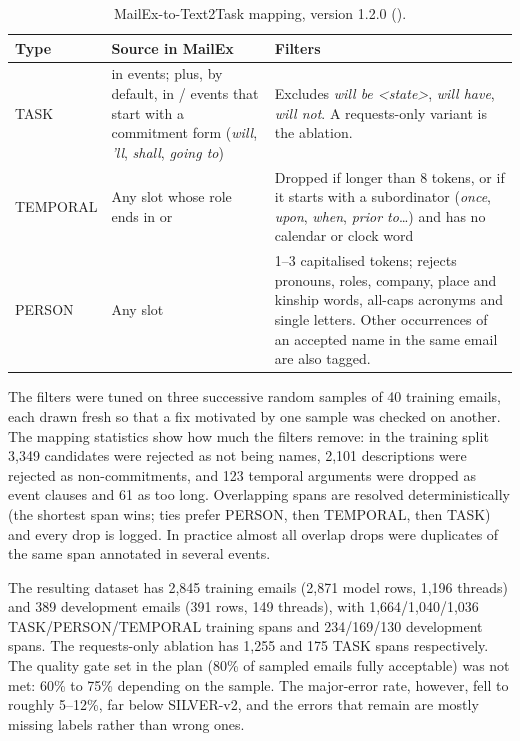 \begin{table}[h]
\centering
\caption{MailEx-to-Text2Task mapping, version 1.2.0 ().}
\label{tab:mapping}
\footnotesize
\begin{tabularx}{\linewidth}{@{}p{17mm}LL@{}}
\toprule
Type & Source in MailEx & Filters \\
\midrule
TASK &  in  events; plus, by default,  in / events that start with a commitment form (\emph{will}, \emph{'ll}, \emph{shall}, \emph{going to}) & Excludes \emph{will be \textless state\textgreater}, \emph{will have}, \emph{will not}. A requests-only variant is the ablation. \\
TEMPORAL & Any slot whose role ends in  or  & Dropped if longer than 8 tokens, or if it starts with a subordinator (\emph{once}, \emph{upon}, \emph{when}, \emph{prior to}\ldots) and has no calendar or clock word \\
PERSON & Any  slot & 1--3 capitalised tokens; rejects pronouns, roles, company, place and kinship words, all-caps acronyms and single letters. Other occurrences of an accepted name in the same email are also tagged. \\
\bottomrule
\end{tabularx}
\end{table}

The filters were tuned on three successive random samples of 40 training emails, each drawn fresh so that a fix motivated by one sample was checked on another. The mapping statistics show how much the filters remove: in the training split 3,349  candidates were rejected as not being names, 2,101  descriptions were rejected as non-commitments, and 123 temporal arguments were dropped as event clauses and 61 as too long. Overlapping spans are resolved deterministically (the shortest span wins; ties prefer PERSON, then TEMPORAL, then TASK) and every drop is logged. In practice almost all overlap drops were duplicates of the same span annotated in several events.

The resulting dataset has 2,845 training emails (2,871 model rows, 1,196 threads) and 389 development emails (391 rows, 149 threads), with 1,664/1,040/1,036 TASK/PERSON/TEMPORAL training spans and 234/169/130 development spans. The requests-only ablation has 1,255 and 175 TASK spans respectively. The quality gate set in the plan (80\% of sampled emails fully acceptable) was not met: 60\% to 75\% depending on the sample. The major-error rate, however, fell to roughly 5--12\%, far below SILVER-v2, and the errors that remain are mostly missing labels rather than wrong ones.

